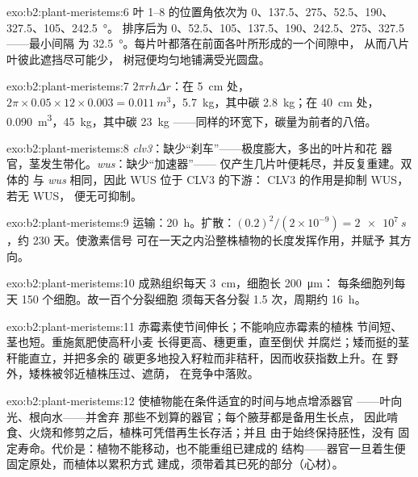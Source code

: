 \begin{solution}{exo:b2:plant-meristems:6}
叶 1--8 的位置角依次为 0、137.5、275、52.5、190、327.5、105、\qty{242.5}{\degree}。
排序后为 0、52.5、105、137.5、190、242.5、275、327.5——最小间隔
为 \qty{32.5}{\degree}。每片叶都落在前面各叶所形成的一个间隙中，
从而八片叶彼此遮挡尽可能少，
树冠便均匀地铺满受光圆盘。
\end{solution}

\begin{solution}{exo:b2:plant-meristems:7}
$2\pi r h\Delta r$：在 \qty{5}{cm} 处，$2\pi\times 0.05\times 12\times
0.003 = \qty{0.011}{m^3}$，\qty{5.7}{kg}，其中碳 \qty{2.8}{kg}；在
\qty{40}{cm} 处，\qty{0.090}{m^3}，\qty{45}{kg}，其中碳 \qty{23}{kg}
——同样的环宽下，碳量为前者的八倍。
\end{solution}

\begin{solution}{exo:b2:plant-meristems:8}
\emph{clv3}：缺少“刹车”——极度膨大，多出的叶片和花
器官，茎发生带化。\emph{wus}：缺少“加速器”——
仅产生几片叶便耗尽，并反复重建。双体的
与 \emph{wus} 相同，因此 WUS 位于 CLV3 的下游：
CLV3 的作用是抑制 WUS，若无 WUS，
便无可抑制。
\end{solution}

\begin{solution}{exo:b2:plant-meristems:9}
运输：\qty{20}{h}。扩散：$(0.2)^{2}/(2\times 10^{-9}) =
\qty{2e7}{s}$，约 230 天。使激素信号
可在一天之内沿整株植物的长度发挥作用，并赋予
其方向。
\end{solution}

\begin{solution}{exo:b2:plant-meristems:10}
成熟组织每天 \qty{3}{cm}，细胞长 \qty{200}{\micro m}：
每条细胞列每天 \num{150} 个细胞。故一百个分裂细胞
须每天各分裂 1.5 次，周期约 \qty{16}{h}。
\end{solution}

\begin{solution}{exo:b2:plant-meristems:11}
赤霉素使节间伸长；不能响应赤霉素的植株
节间短、茎也短。重施氮肥使高秆小麦
长得更高、穗更重，直至倒伏
并腐烂；矮而挺的茎秆能直立，并把多余的
碳更多地投入籽粒而非秸秆，因而收获指数上升。在
野外，矮株被邻近植株压过、遮荫，
在竞争中落败。
\end{solution}

\begin{solution}{exo:b2:plant-meristems:12}
使植物能在条件适宜的时间与地点增添器官
——叶向光、根向水——并舍弃
那些不划算的器官；每个腋芽都是备用生长点，
因此啃食、火烧和修剪之后，植株可凭借再生长存活；并且
由于始终保持胚性，没有
固定寿命。代价是：植物不能移动，也不能重组已建成的
结构——器官一旦着生便固定原处，而植体以累积方式
建成，须带着其已死的部分（心材）。
\end{solution}

